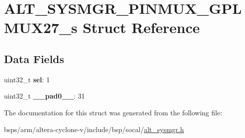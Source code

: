 \hypertarget{structALT__SYSMGR__PINMUX__GPLMUX27__s}{}\section{A\+L\+T\+\_\+\+S\+Y\+S\+M\+G\+R\+\_\+\+P\+I\+N\+M\+U\+X\+\_\+\+G\+P\+L\+M\+U\+X27\+\_\+s Struct Reference}
\label{structALT__SYSMGR__PINMUX__GPLMUX27__s}
\subsection*{Data Fields}
\begin{DoxyCompactItemize}
\item 
\mbox{\label{structALT__SYSMGR__PINMUX__GPLMUX27__s_a183f70c6e0411261b61e6bbf8ad588d1}} 
uint32\+\_\+t {\bfseries sel}\+: 1
\item 
\mbox{\label{structALT__SYSMGR__PINMUX__GPLMUX27__s_abb0521516c5166e716e954663b175b03}} 
uint32\+\_\+t {\bfseries \+\_\+\+\_\+pad0\+\_\+\+\_\+}\+: 31
\end{DoxyCompactItemize}


The documentation for this struct was generated from the following file\+:\begin{DoxyCompactItemize}
\item 
bsps/arm/altera-\/cyclone-\/v/include/bsp/socal/\mbox{\hyperlink{alt__sysmgr_8h}{alt\+\_\+sysmgr.\+h}}\end{DoxyCompactItemize}
